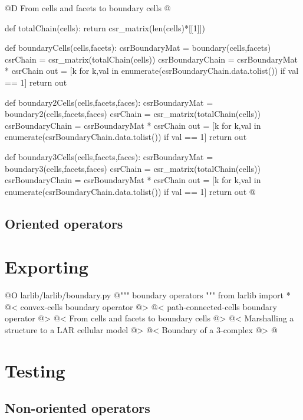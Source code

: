 \documentclass[11pt,oneside]{article}	%
\begin{document}
@D From cells and facets to boundary cells
@{def totalChain(cells):
    return csr_matrix(len(cells)*[[1]])

def boundaryCells(cells,facets):
    csrBoundaryMat = boundary(cells,facets)
    csrChain = csr_matrix(totalChain(cells))
    csrBoundaryChain = csrBoundaryMat * csrChain
    out = [k for k,val in enumerate(csrBoundaryChain.data.tolist()) if val == 1]
    return out

def boundary2Cells(cells,facets,faces):
    csrBoundaryMat = boundary2(cells,facets,faces)
    csrChain = csr_matrix(totalChain(cells))
    csrBoundaryChain = csrBoundaryMat * csrChain
    out = [k for k,val in enumerate(csrBoundaryChain.data.tolist()) if val == 1]
    return out

def boundary3Cells(cells,facets,faces):
    csrBoundaryMat = boundary3(cells,facets,faces)
    csrChain = csr_matrix(totalChain(cells))
    csrBoundaryChain = csrBoundaryMat * csrChain
    out = [k for k,val in enumerate(csrBoundaryChain.data.tolist()) if val == 1]
    return out
@}



\subsection{Oriented operators}


\section{Exporting}

@O larlib/larlib/boundary.py
@{""" boundary operators """
from larlib import *
@< convex-cells boundary operator @>
@< path-connected-cells boundary operator @>
@< From cells and facets to boundary cells @>
@< Marshalling a structure to a LAR cellular model @>
@< Boundary of a 3-complex @>
@}


\section{Testing}

\subsection{Non-oriented operators}
\end{document}
